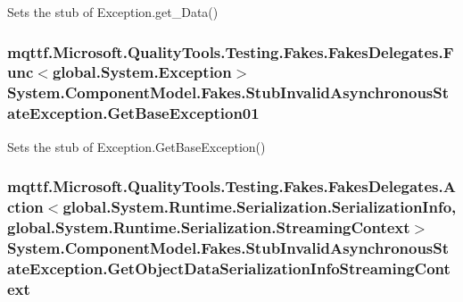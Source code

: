 Sets the stub of Exception.\-get\-\_\-\-Data()

\hypertarget{class_system_1_1_component_model_1_1_fakes_1_1_stub_invalid_asynchronous_state_exception_ae31630be8d184655427a9a672236546c}{
\subsubsection[{Get\-Base\-Exception01}]{\setlength{\rightskip}{0pt plus 5cm}mqttf.\-Microsoft.\-Quality\-Tools.\-Testing.\-Fakes.\-Fakes\-Delegates.\-Func$<$global.\-System.\-Exception$>$ System.\-Component\-Model.\-Fakes.\-Stub\-Invalid\-Asynchronous\-State\-Exception.\-Get\-Base\-Exception01}}\label{class_system_1_1_component_model_1_1_fakes_1_1_stub_invalid_asynchronous_state_exception_ae31630be8d184655427a9a672236546c}


Sets the stub of Exception.\-Get\-Base\-Exception()

\hypertarget{class_system_1_1_component_model_1_1_fakes_1_1_stub_invalid_asynchronous_state_exception_a44f28f931ce937f67f4219a55bd20630}{
\subsubsection[{Get\-Object\-Data\-Serialization\-Info\-Streaming\-Context}]{\setlength{\rightskip}{0pt plus 5cm}mqttf.\-Microsoft.\-Quality\-Tools.\-Testing.\-Fakes.\-Fakes\-Delegates.\-Action$<$global.\-System.\-Runtime.\-Serialization.\-Serialization\-Info, global.\-System.\-Runtime.\-Serialization.\-Streaming\-Context$>$ System.\-Component\-Model.\-Fakes.\-Stub\-Invalid\-Asynchronous\-State\-Exception.\-Get\-Object\-Data\-Serialization\-Info\-Streaming\-Context}}\label{class_system_1_1_component_model_1_1_fakes_1_1_stub_invalid_asynchronous_state_exception_a44f28f931ce937f67f4219a55bd20630}


